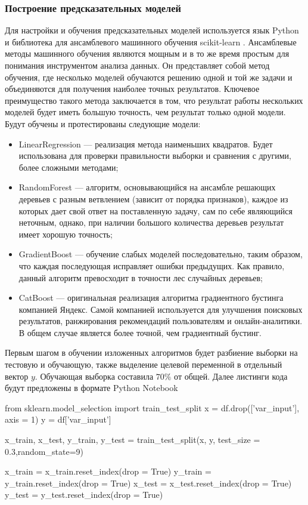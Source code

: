 \subsubsection{Построение предсказательных моделей}
Для настройки и обучения предсказательных моделей используется язык Python и библиотека для ансамблевого машинного обучения scikit-learn \cite{hackeling2017mastering}. Ансамблевые методы машинного обучения являются мощным и в то же время простым для понимания инструментом анализа данных. Он представляет собой метод обучения, где несколько моделей обучаются решению одной и той же задачи и объединяются для получения наиболее точных результатов. Ключевое преимущество такого метода заключается в том, что результат работы нескольких моделей будет иметь большую точность, чем результат только одной модели.
Будут обучены и протестированы следующие модели:
\begin{itemize}
	\item LinearRegression --- реализация метода наименьших квадратов. Будет использована для проверки правильности выборки и сравнения с другими, более сложными методами;
	\item RandomForest \cite{rigatti2017random} --- алгоритм, основывающийся на ансамбле решающих деревьев с разным ветвлением (зависит от порядка признаков), каждое из которых дает свой ответ на поставленную задачу, сам по себе являющийся неточным, однако, при наличии большого количества деревьев результат имеет хорошую точность;
	\item GradientBoost \cite{natekin2013gradient} --- обучение слабых моделей последовательно, таким образом, что каждая последующая исправляет ошибки предыдущих. Как правило, данный алгоритм превосходит в точности лес случайных деревьев;
	\item CatBoost \cite{hancock2020catboost} --- оригинальная реализация алгоритма градиентного бустинга компанией Яндекс. Самой компанией используется для улучшения поисковых результатов,  ранжирования рекомендаций пользователям и онлайн-аналитики. В общем случае является более точной, чем градиентный бустинг.
\end{itemize}

Первым шагом в обучении изложенных алгоритмов будет разбиение выборки на тестовую и обучающую, также выделение целевой переменной в отдельный вектор $y$. Обучающая выборка составила $70\%$ от общей. Далее листинги кода будут предложены в формате Python Notebook
\begin{pyin}
from sklearn.model_selection import train_test_split
x = df.drop(['var_input'], axis = 1)
y = df['var_input']

x_train, x_test, y_train, y_test = train_test_split(x, y, test_size = 0.3,random_state=9)

x_train = x_train.reset_index(drop = True)
y_train = y_train.reset_index(drop = True)
x_test = x_test.reset_index(drop = True)
y_test = y_test.reset_index(drop = True)
\end{pyin}

